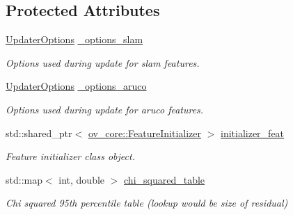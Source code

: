 \subsection*{Protected Attributes}
\begin{DoxyCompactItemize}
\item 
\mbox{\label{classov__msckf_1_1UpdaterSLAM_a219d1a88421f59b953e65e835776cfd9}} 
\hyperlink{structov__msckf_1_1UpdaterOptions}{Updater\+Options} \hyperlink{classov__msckf_1_1UpdaterSLAM_a219d1a88421f59b953e65e835776cfd9}{\+\_\+options\+\_\+slam}
\begin{DoxyCompactList}\small\item\em Options used during update for slam features. \end{DoxyCompactList}\item 
\mbox{\label{classov__msckf_1_1UpdaterSLAM_abf282c84f49d9ec4514c530b3a97f683}} 
\hyperlink{structov__msckf_1_1UpdaterOptions}{Updater\+Options} \hyperlink{classov__msckf_1_1UpdaterSLAM_abf282c84f49d9ec4514c530b3a97f683}{\+\_\+options\+\_\+aruco}
\begin{DoxyCompactList}\small\item\em Options used during update for aruco features. \end{DoxyCompactList}\item 
\mbox{\label{classov__msckf_1_1UpdaterSLAM_a2adf90e25fa4a3abf697eba018e0b65e}} 
std\+::shared\+\_\+ptr$<$ \hyperlink{classov__core_1_1FeatureInitializer}{ov\+\_\+core\+::\+Feature\+Initializer} $>$ \hyperlink{classov__msckf_1_1UpdaterSLAM_a2adf90e25fa4a3abf697eba018e0b65e}{initializer\+\_\+feat}
\begin{DoxyCompactList}\small\item\em Feature initializer class object. \end{DoxyCompactList}\item 
\mbox{\label{classov__msckf_1_1UpdaterSLAM_a550ec76668fcbb2a8cb8245c6c08fddd}} 
std\+::map$<$ int, double $>$ \hyperlink{classov__msckf_1_1UpdaterSLAM_a550ec76668fcbb2a8cb8245c6c08fddd}{chi\+\_\+squared\+\_\+table}
\begin{DoxyCompactList}\small\item\em Chi squared 95th percentile table (lookup would be size of residual) \end{DoxyCompactList}\end{DoxyCompactItemize}


